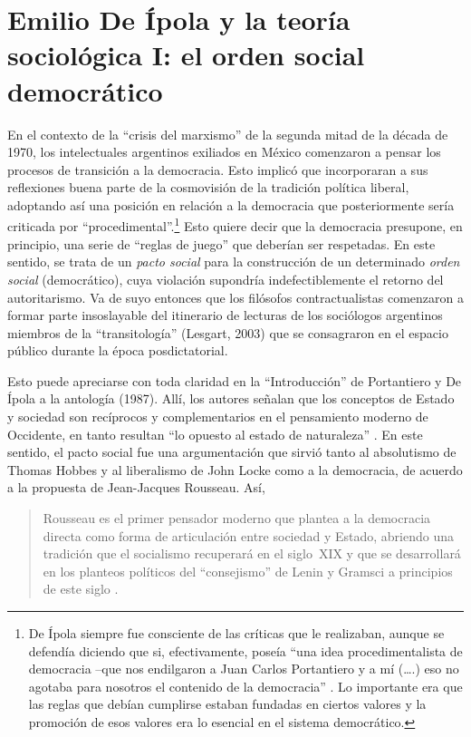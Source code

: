 \section{Emilio De Ípola y la teoría sociológica I: el orden social democrático}

En el contexto de la \enquote{crisis del marxismo} de la segunda mitad de la década de 1970, los intelectuales argentinos exiliados en México comenzaron a pensar los procesos de transición a la democracia. Esto implicó que incorporaran a sus reflexiones buena parte de la cosmovisión de la tradición política liberal, adoptando así una posición en relación a la democracia que posteriormente sería criticada por \enquote{procedimental}.\footnote{De Ípola siempre fue consciente de las críticas que le realizaban, aunque se defendía diciendo que si, efectivamente, poseía \enquote{una idea procedimentalista de democracia --que nos endilgaron a Juan Carlos Portantiero y a mí (\dots.) eso no agotaba para nosotros el contenido de la democracia} \parencite[101]{1525-RINESI2004}. Lo importante era que las reglas que debían cumplirse estaban fundadas en ciertos valores y la promoción de esos valores era lo esencial en el sistema democrático.} Esto quiere decir que la democracia presupone, en principio, una serie de \enquote{reglas de juego} que deberían ser respetadas. En este sentido, se trata de un \emph{pacto social} para la construcción de un determinado \emph{orden social} (democrático), cuya violación supondría indefectiblemente el retorno del autoritarismo. Va de suyo entonces que los filósofos contractualistas comenzaron a formar parte insoslayable del itinerario de lecturas de los sociólogos argentinos miembros de la \enquote{transitología} (Lesgart, 2003) que se consagraron en el espacio público durante la época posdictatorial.

Esto puede apreciarse con toda claridad en la \enquote{Introducción} de Portantiero y De Ípola a la antología  (1987). Allí, los autores señalan que los conceptos de Estado y sociedad son recíprocos y complementarios en el pensamiento moderno de Occidente, en tanto resultan \enquote{lo opuesto al estado de naturaleza} \parencite[7]{1540-PORTANTIERO1987}. En este sentido, el pacto social fue una argumentación que sirvió tanto al absolutismo de Thomas Hobbes y al liberalismo de John Locke como a la democracia, de acuerdo a la propuesta de Jean-Jacques Rousseau. Así,

\begin{quote}
Rousseau es el primer pensador moderno que plantea a la democracia directa como forma de articulación entre sociedad y Estado, abriendo una tradición que el socialismo recuperará en el siglo~XIX y que se desarrollará en los planteos políticos del \enquote{consejismo} de Lenin y Gramsci a principios de este siglo \parencite[10]{1540-PORTANTIERO1987}.
\end{quote}

